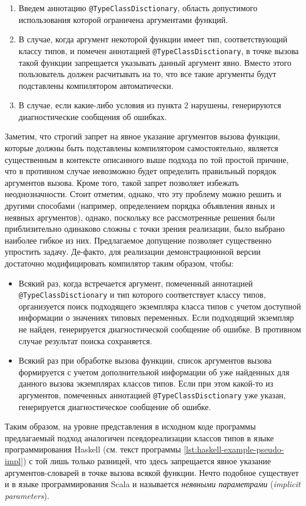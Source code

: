 \begin{enumerate} 
    \item Введем аннотацию \lstinline{@TypeClassDisctionary}, область допустимого использования которой ограничена аргументами функций. 
    \item В случае, когда аргумент некоторой функции имеет тип, соответствующий классу типов, и помечен аннотацией \lstinline{@TypeClassDisctionary}, в точке вызова такой функции запрещается указывать данный аргумент явно. Вместо этого пользователь должен расчитывать на то, что все такие аргументы будут подставлены компилятором автоматически. 
    \item В случае, если какие-либо условия из пункта $2$ нарушены, генерируются диагностические сообщения об ошибках.
\end{enumerate}
 Заметим, что строгий запрет на явное указание аргументов вызова функции, которые должны быть подставлены компилятором самостоятельно, является существенным в контексте описанного выше подхода по той простой причине, что в противном случае невозможно будет определить правильный порядок аргументов вызова. Кроме того, такой запрет позволяет избежать неоднозначности. Стоит отметим, однако, что эту проблему можно решить и другими способами (например, определением порядка объявления явных и неявных аргументов), однако, поскольку все рассмотренные решения были приблизительно одинаково сложны с точки зрения реализации, было выбрано наиболее гибкое из них. Предлагаемое допущение позволяет существенно упростить задачу. Де-факто, для реализации демонстрационной версии достаточно модифицировать компилятор таким образом, чтобы:
\begin{itemize}
    \item Всякий раз, когда встречается аргумент, помеченный аннотацией \lstinline{@TypeClassDisctionary} и тип которого соответствует классу типов, организуется поиск подходящего экземпляра класса типов с учетом доступной информации о значениях типовых переменных. Если подходящий экземпляр не найден, генерируется диагностической сообщение об ошибке. В противном случае результат поиска сохраняется.
    \item Всякий раз при обработке вызова функции, список аргументов вызова формируется с учетом дополнительной информации об уже найденных для данного вызова экземплярах классов типов. Если при этом какой-то из аргументов, помеченных аннотацией \lstinline{@TypeClassDisctionary} уже указан, генерируется диагностическое сообщение об ошибке.
\end{itemize}
Таким образом, на уровне представления в исходном коде программы предлагаемый подход аналогичен  псевдореализации классов типов в языке программирования Haskell (см. текст программы \ref{lst:haskell-example-pseudo-impl}) с той лишь только разницей, что здесь запрещается явное указание аргументов-словарей в точке вызова всякой функции. Нечто подобное существует и в языке программирования Scala и называется \emph{неявными параметрами} (\emph{implicit parameters}). 

